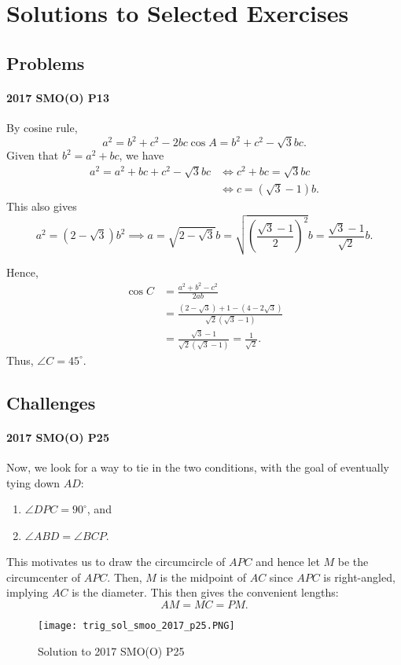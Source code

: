 \documentclass[../jarvis.tex]{subfiles}
\begin{document}
\section{Solutions to Selected Exercises}
\subsection{Problems}
\paragraph{2017 SMO(O) P13} By cosine rule, 
$$a^2=b^2+c^2-2bc\cos{A}=b^2+c^2-\sqrt{3}bc.$$
Given that $b^2=a^2+bc$, we have
\begin{align*}
    a^2=a^2+bc+c^2-\sqrt{3}bc &\iff c^2+bc=\sqrt{3}bc \\
    &\iff c=(\sqrt{3}-1)b. 
\end{align*}
This also gives $$a^2=(2-\sqrt{3})b^2 \implies a=\sqrt{2-\sqrt{3}}b=\sqrt{\left(\frac{\sqrt{3}-1}{2}\right)^2}b=\frac{\sqrt{3}-1}{\sqrt{2}}b.$$

Hence, \begin{align*}
    \cos{C}&=\frac{a^2+b^2-c^2}{2ab} \\
        &=\frac{(2-\sqrt{3})+1-(4-2\sqrt{3})}{\sqrt{2}(\sqrt{3}-1)} \\
        &=\frac{\sqrt{3}-1}{\sqrt{2}(\sqrt{3}-1)}=\frac{1}{\sqrt{2}}.
\end{align*}
Thus, $\angle C=\boxed{45^{\circ}}$.

\subsection{Challenges}
\paragraph{2017 SMO(O) P25}
Now, we look for a way to tie in the two conditions, with the goal of eventually tying down $AD$:
\begin{enumerate}
    \item $\angle DPC=90^{\circ}$, and
    \item $\angle ABD=\angle BCP$.
\end{enumerate}
This motivates us to draw the circumcircle of $APC$ and hence let $M$ be the circumcenter of $APC$. Then, $M$ is the midpoint of $AC$ since $APC$ is right-angled, implying $AC$ is the diameter. This then gives the convenient lengths:
$$AM=MC=PM.$$

\begin{figure}[H]
    \centering
    \texttt{[image: trig\_sol\_smoo\_2017\_p25.PNG]}
    \caption{Solution to 2017 SMO(O) P25}
\end{figure}
\end{document}
